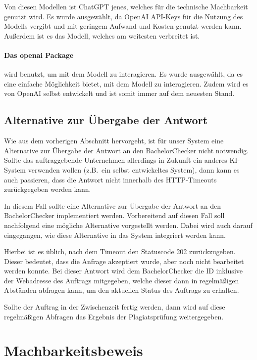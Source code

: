 Von diesen Modellen ist ChatGPT jenes, welches für die technische Machbarkeit genutzt wird.
Es wurde ausgewählt, da OpenAI API-Keys für die Nutzung des Modells vergibt und mit geringem Aufwand und Kosten genutzt werden kann.
Außerdem ist es das Modell, welches am weitesten verbreitet ist.

\paragraph{Das openai Package} wird benutzt, um mit dem Modell zu interagieren.
Es wurde ausgewählt, da es eine einfache Möglichkeit bietet, mit dem Modell zu interagieren.
Zudem wird es von OpenAI selbst entwickelt und ist somit immer auf dem neuesten Stand.


\subsection{Alternative zur Übergabe der Antwort}\label{subsec:alternative-zur-uebergabe-der-antwort}
Wie aus dem vorherigen Abschnitt hervorgeht, ist für unser System eine Alternative zur Übergabe der Antwort
an den BachelorChecker nicht notwendig.
Sollte das auftraggebende Unternehmen allerdings in Zukunft ein anderes KI-System verwenden wollen (z.B.\ ein selbst entwickeltes System),
dann kann es auch passieren, dass die Antwort nicht innerhalb des HTTP-Timeouts zurückgegeben werden kann.

In diesem Fall sollte eine Alternative zur Übergabe der Antwort an den BachelorChecker implementiert werden.
Vorbereitend auf diesen Fall soll nachfolgend eine mögliche Alternative vorgestellt werden.
Dabei wird auch darauf eingegangen, wie diese Alternative in das System integriert werden kann.

Hierbei ist es üblich, nach dem Timeout den Statuscode 202 zurückzugeben.
Dieser bedeutet, dass die Anfrage akzeptiert wurde, aber noch nicht bearbeitet werden konnte\autocite{mozilla}.
Bei dieser Antwort wird dem BachelorChecker die ID inklusive der Webadresse des Auftrags mitgegeben,
welche dieser dann in regelmäßigen Abständen abfragen kann, um den aktuellen Status des Auftrags zu erhalten.

Sollte der Auftrag in der Zwischenzeit fertig werden, dann wird auf diese regelmäßigen Abfragen das Ergebnis
der Plagiatsprüfung weitergegeben.


\section{Machbarkeitsbeweis}\label{sec:machbarkeitsbeweis}